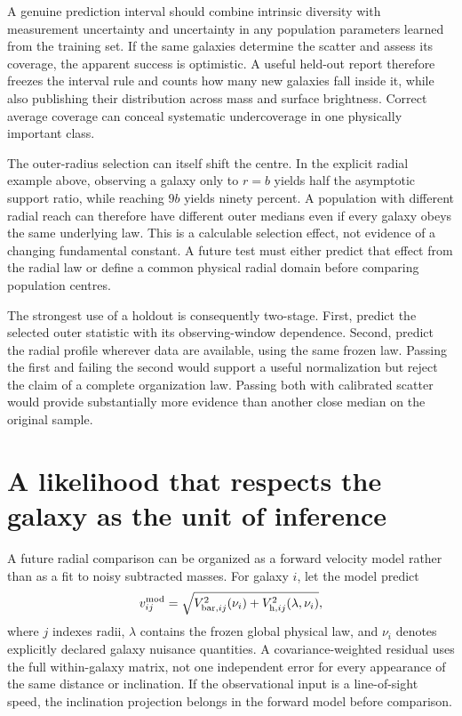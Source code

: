 A genuine prediction interval should combine intrinsic diversity with measurement uncertainty and uncertainty in any population parameters learned from the training set. If the same galaxies determine the scatter and assess its coverage, the apparent success is optimistic. A useful held-out report therefore freezes the interval rule and counts how many new galaxies fall inside it, while also publishing their distribution across mass and surface brightness. Correct average coverage can conceal systematic undercoverage in one physically important class.

The outer-radius selection can itself shift the centre. In the explicit radial example above, observing a galaxy only to $r=b$ yields half the asymptotic support ratio, while reaching $9b$ yields ninety percent. A population with different radial reach can therefore have different outer medians even if every galaxy obeys the same underlying law. This is a calculable selection effect, not evidence of a changing fundamental constant. A future test must either predict that effect from the radial law or define a common physical radial domain before comparing population centres.

The strongest use of a holdout is consequently two-stage. First, predict the selected outer statistic with its observing-window dependence. Second, predict the radial profile wherever data are available, using the same frozen law. Passing the first and failing the second would support a useful normalization but reject the claim of a complete organization law. Passing both with calibrated scatter would provide substantially more evidence than another close median on the original sample.

\section{A likelihood that respects the galaxy as the unit of inference}

A future radial comparison can be organized as a forward velocity model rather than as a fit to noisy subtracted masses. For galaxy $i$, let the model predict
\begin{equation}
 v_{ij}^{\rm mod}=\sqrt{V_{{\rm bar},ij}^2(\nu_i)
 +V_{{\rm h},ij}^2(\lambda,\nu_i)},
 \label{c10:forwardvelocity}
\end{equation}
where $j$ indexes radii, $\lambda$ contains the frozen global physical law, and $\nu_i$ denotes explicitly declared galaxy nuisance quantities. A covariance-weighted residual uses the full within-galaxy matrix, not one independent error for every appearance of the same distance or inclination. If the observational input is a line-of-sight speed, the inclination projection belongs in the forward model before comparison.

